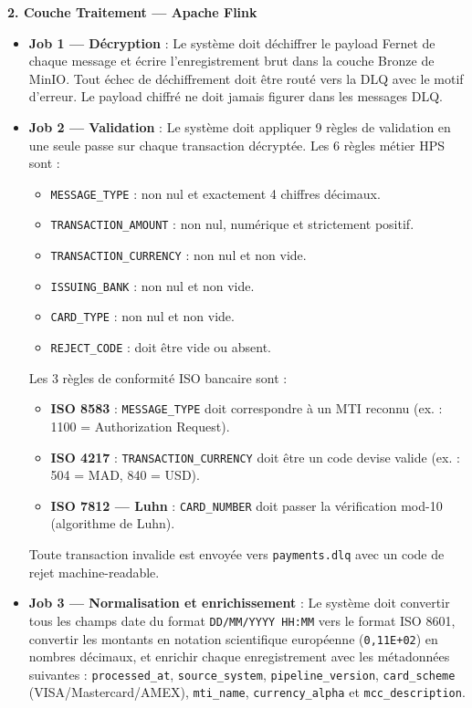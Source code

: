 \vspace{0.3cm}
\textbf{2. Couche Traitement --- Apache Flink}

\begin{itemize}[leftmargin=1.5cm]
    \item \textbf{Job 1 --- Décryption} : Le système doit déchiffrer le payload Fernet de chaque message et écrire l'enregistrement brut dans la couche Bronze de MinIO. Tout échec de déchiffrement doit être routé vers la DLQ avec le motif d'erreur. Le payload chiffré ne doit jamais figurer dans les messages DLQ.

    \item \textbf{Job 2 --- Validation} : Le système doit appliquer 9 règles de validation en une seule passe sur chaque transaction décryptée. Les 6 règles métier HPS sont :
        \begin{itemize}
            \item \texttt{MESSAGE\_TYPE} : non nul et exactement 4 chiffres décimaux.
            \item \texttt{TRANSACTION\_AMOUNT} : non nul, numérique et strictement positif.
            \item \texttt{TRANSACTION\_CURRENCY} : non nul et non vide.
            \item \texttt{ISSUING\_BANK} : non nul et non vide.
            \item \texttt{CARD\_TYPE} : non nul et non vide.
            \item \texttt{REJECT\_CODE} : doit être vide ou absent.
        \end{itemize}
        Les 3 règles de conformité ISO bancaire sont :
        \begin{itemize}
            \item \textbf{ISO 8583} : \texttt{MESSAGE\_TYPE} doit correspondre à un MTI reconnu (ex. : 1100 = Authorization Request).
            \item \textbf{ISO 4217} : \texttt{TRANSACTION\_CURRENCY} doit être un code devise valide (ex. : 504 = MAD, 840 = USD).
            \item \textbf{ISO 7812 --- Luhn} : \texttt{CARD\_NUMBER} doit passer la vérification mod-10 (algorithme de Luhn).
        \end{itemize}
    Toute transaction invalide est envoyée vers \texttt{payments.dlq} avec un code de rejet machine-readable.

    \item \textbf{Job 3 --- Normalisation et enrichissement} : Le système doit convertir tous les champs date du format \texttt{DD/MM/YYYY HH:MM} vers le format ISO 8601, convertir les montants en notation scientifique européenne (\texttt{0,11E+02}) en nombres décimaux, et enrichir chaque enregistrement avec les métadonnées suivantes : \texttt{processed\_at}, \texttt{source\_system}, \texttt{pipeline\_version}, \texttt{card\_scheme} (VISA/Mastercard/AMEX), \texttt{mti\_name}, \texttt{currency\_alpha} et \texttt{mcc\_description}.


\end{itemize}
